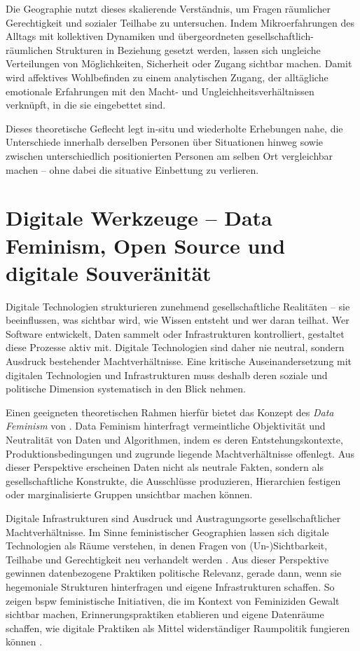 Die Geographie nutzt dieses skalierende Verständnis, um Fragen räumlicher Gerechtigkeit und sozialer Teilhabe zu untersuchen. Indem Mikroerfahrungen des Alltags mit kollektiven Dynamiken und übergeordneten gesellschaftlich-räumlichen Strukturen in Beziehung gesetzt werden, lassen sich ungleiche Verteilungen von Möglichkeiten, Sicherheit oder Zugang sichtbar machen. Damit wird affektives Wohlbefinden zu einem analytischen Zugang, der alltägliche emotionale Erfahrungen mit den Macht- und Ungleichheitsverhältnissen verknüpft, in die sie eingebettet sind.

Dieses theoretische Geflecht legt in-situ und wiederholte Erhebungen nahe, die Unterschiede innerhalb derselben Personen über Situationen hinweg sowie zwischen unterschiedlich positionierten Personen am selben Ort vergleichbar machen -- ohne dabei die situative Einbettung zu verlieren.

\section{Digitale Werkzeuge -- Data Feminism, Open Source und digitale Souveränität}
\label{sec:datafeminism}

Digitale Technologien strukturieren zunehmend gesellschaftliche Realitäten -- sie beeinflussen, was sichtbar wird, wie Wissen entsteht und wer daran teilhat. Wer Software entwickelt, Daten sammelt oder Infrastrukturen kontrolliert, gestaltet diese Prozesse aktiv mit. Digitale Technologien sind daher nie neutral, sondern Ausdruck bestehender Machtverhältnisse. Eine kritische Auseinandersetzung mit digitalen Technologien und Infrastrukturen muss deshalb deren soziale und politische Dimension systematisch in den Blick nehmen.

Einen geeigneten theoretischen Rahmen hierfür bietet das Konzept des \textit{Data Feminism} von \textcite{dignazioDataFeminism2020}. Data Feminism hinterfragt vermeintliche Objektivität und Neutralität von Daten und Algorithmen, indem es deren Entstehungskontexte, Produktionsbedingungen und zugrunde liegende Machtverhältnisse offenlegt. Aus dieser Perspektive erscheinen Daten nicht als neutrale Fakten, sondern als gesellschaftliche Konstrukte, die Ausschlüsse produzieren, Hierarchien festigen oder marginalisierte Gruppen unsichtbar machen können.

Digitale Infrastrukturen sind Ausdruck und Austragungsorte gesellschaftlicher Machtverhältnisse. Im Sinne feministischer Geographien lassen sich digitale Technologien als Räume verstehen, in denen Fragen von (Un-)Sichtbarkeit, Teilhabe und Gerechtigkeit neu verhandelt werden \parencite{elwoodFeministDigitalGeographies2018}. Aus dieser Perspektive gewinnen datenbezogene Praktiken politische Relevanz, gerade dann, wenn sie hegemoniale Strukturen hinterfragen und eigene Infrastrukturen schaffen. So zeigen \gls{bspw} feministische Initiativen, die im Kontext von Feminiziden Gewalt sichtbar machen, Erinnerungspraktiken etablieren und eigene Datenräume schaffen, wie digitale Praktiken als Mittel widerständiger Raumpolitik fungieren können \parencite{dignazioGeographiesMissingData2024}.

